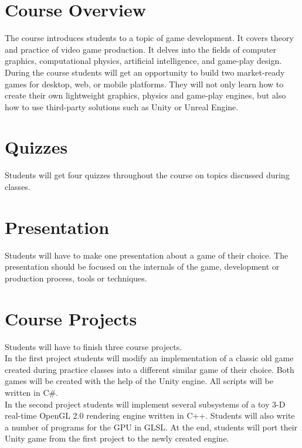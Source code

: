 \documentclass[12pt,a4paper,oneside]{article}
\begin{document}
    \section{Course Overview}

        The course introduces students to a topic of game development. It covers
        theory and practice of video game production. It delves into the fields
        of computer graphics, computational physics, artificial intelligence,
        and game-play design. During the course students will get an opportunity
        to build two market-ready games for desktop, web, or mobile platforms.
        They will not only learn how to create their own lightweight graphics,
        physics and game-play engines, but also how to use third-party solutions
        such as Unity or Unreal Engine.

    \section{Quizzes}

        Students will get four quizzes throughout the course on topics discussed
        during classes.

    \section{Presentation}

        Students will have to make one presentation about a game of their
        choice.  The presentation should be focused on the internals of the
        game, development or production process, tools or techniques.

    \section{Course Projects}

        Students will have to finish three course projects.\\

        In the first project students will modify an implementation of a classic
        old game created during practice classes into a different similar game
        of their choice. Both games will be created with the help of the Unity
        engine. All scripts will be written in C\#.\\

        In the second project students will implement several subsystems of a
        toy 3-D real-time OpenGL 2.0 rendering engine written in C++. Students
        will also write a number of programs for the GPU in GLSL. At the end,
        students will port their Unity game from the first project to the newly
        created engine.\\
\end{document}
